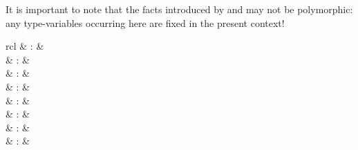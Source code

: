 \begin{isabellebody}
\begin{isamarkuptext}
  It is important to note that the facts introduced by \hyperlink{command.obtain}{\mbox{}} and \hyperlink{command.guess}{\mbox{}} may not be polymorphic: any
  type-variables occurring here are fixed in the present context!%
\end{isamarkuptext}%
\isamarkuptrue%
%
\isamarkuptrue%
%
\begin{isamarkuptext}%
\begin{matharray}{rcl}
    \hypertarget{command.also}{\hyperlink{command.also}{\mbox{}}} & : &  \\
    \hypertarget{command.finally}{\hyperlink{command.finally}{\mbox{}}} & : &  \\
    \hypertarget{command.moreover}{\hyperlink{command.moreover}{\mbox{}}} & : &  \\
    \hypertarget{command.ultimately}{\hyperlink{command.ultimately}{\mbox{}}} & : &  \\
    \hypertarget{command.print-trans-rules}{\hyperlink{command.print-trans-rules}{\mbox{}}}\isa{{\isachardoublequote}\isactrlsup {\isacharasterisk}{\isachardoublequote}} & : &  \\
    \hyperlink{attribute.trans}{\mbox{}} & : &  \\
    \hyperlink{attribute.sym}{\mbox{}} & : &  \\
    \hyperlink{attribute.symmetric}{\mbox{}} & : &  \\
  \end{matharray}


\end{isamarkuptext}
\end{isabellebody}
